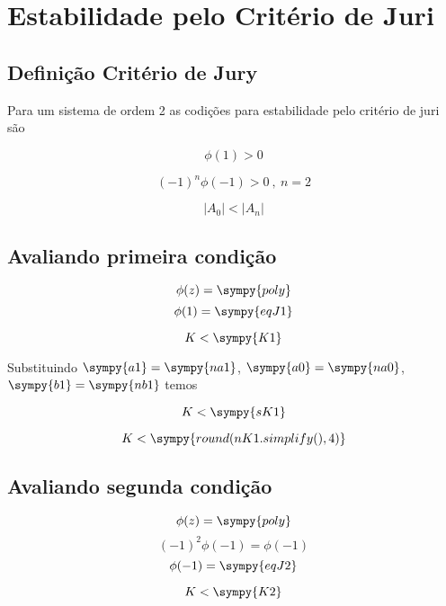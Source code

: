 \documentclass[a4paper,11pt]{article}
\newcommand{\npy}[1]{\sympy{round(#1,4)}}
\begin{document}
\section{Estabilidade pelo Critério de Juri}

\subsection{Definição Critério de Jury}

Para um sistema de ordem 2 as codições para estabilidade pelo critério de juri são

\begin{equation}\label{eq:jury-c1}
    \phi(1) > 0
\end{equation}

\begin{equation}\label{eq:jury-c2}
    (-1)^n\phi(-1) > 0\ ,\ n=2
\end{equation}

\begin{equation}\label{eq:jury-c3}
    |A_0| < |A_n|
\end{equation}

\subsection{Avaliando primeira condição}

$$\phi(z) = \sympy{poly}$$
$$\phi(1) = \sympy{eqJ1}$$

\begin{equation}\label{eq:k-jury-c1}
    K < \sympy{K1}
\end{equation}

Substituindo $\sympy{a1} = \sympy{na1}$, $\sympy{a0} = \sympy{na0}$, $\sympy{b1} = \sympy{nb1}$ temos

$$K < \sympy{sK1}$$

\begin{equation}\label{eq:k-jury-c1-numeric}
    K < \npy{nK1.simplify()}
\end{equation}

\subsection{Avaliando segunda condição}

$$\phi(z) = \sympy{poly}$$
$$(-1)^2\phi(-1) = \phi(-1)$$
$$\phi(-1) = \sympy{eqJ2}$$

\begin{equation}\label{eq:k-jury-c2}
    K < \sympy{K2}
\end{equation}
\end{document}
